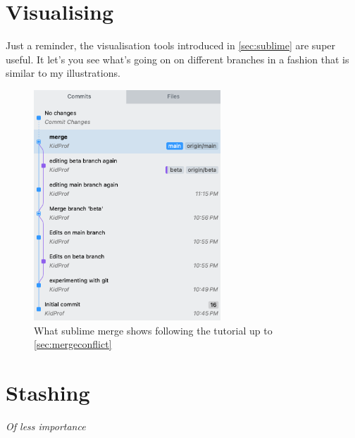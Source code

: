 \section{Visualising}

Just a reminder, the visualisation tools introduced in \cref{sec:sublime} are super useful. It let's you see what's going on on different branches in a fashion that is similar to my illustrations.

\begin{figure}[h]
\centering
\includegraphics[width=7cm]{images/ch8-sublimemerge.png}
\caption{What sublime merge shows following the tutorial up to \cref{sec:mergeconflict}}
\end{figure}


\section{Stashing}

\textit{Of less importance}
\vspace{6mm}


